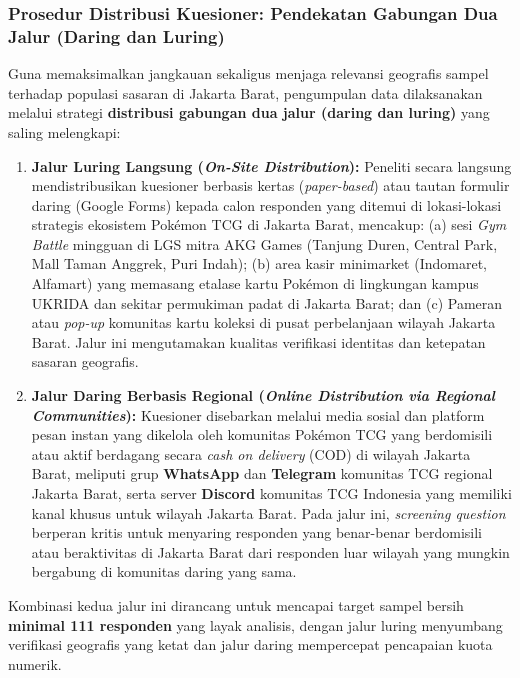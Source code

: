 \documentclass[12pt,a4paper]{article}
\numberwithin{equation}{section}
\numberwithin{table}{section}
\numberwithin{figure}{section}
\begin{document}
\subsubsection{Prosedur Distribusi Kuesioner: Pendekatan Gabungan Dua Jalur (Daring dan Luring)}

Guna memaksimalkan jangkauan sekaligus menjaga relevansi geografis sampel terhadap populasi sasaran di Jakarta Barat, pengumpulan data dilaksanakan melalui strategi \textbf{distribusi gabungan dua jalur (daring dan luring)} yang saling melengkapi:
\begin{enumerate}
  \item \textbf{Jalur Luring Langsung (\emph{On-Site Distribution}):} Peneliti secara langsung mendistribusikan kuesioner berbasis kertas (\emph{paper-based}) atau tautan formulir daring (Google Forms) kepada calon responden yang ditemui di lokasi-lokasi strategis ekosistem Pok\'emon TCG di Jakarta Barat, mencakup: (a) sesi \emph{Gym Battle} mingguan di LGS mitra AKG Games (Tanjung Duren, Central Park, Mall Taman Anggrek, Puri Indah); (b) area kasir minimarket (Indomaret, Alfamart) yang memasang etalase kartu Pok\'emon di lingkungan kampus UKRIDA dan sekitar permukiman padat di Jakarta Barat; dan (c) Pameran atau \emph{pop-up} komunitas kartu koleksi di pusat perbelanjaan wilayah Jakarta Barat. Jalur ini mengutamakan kualitas verifikasi identitas dan ketepatan sasaran geografis.
  \item \textbf{Jalur Daring Berbasis Regional (\emph{Online Distribution via Regional Communities}):} Kuesioner disebarkan melalui media sosial dan platform pesan instan yang dikelola oleh komunitas Pok\'emon TCG yang berdomisili atau aktif berdagang secara \emph{cash on delivery} (COD) di wilayah Jakarta Barat, meliputi grup \textbf{WhatsApp} dan \textbf{Telegram} komunitas TCG regional Jakarta Barat, serta server \textbf{Discord} komunitas TCG Indonesia yang memiliki kanal khusus untuk wilayah Jakarta Barat. Pada jalur ini, \emph{screening question} berperan kritis untuk menyaring responden yang benar-benar berdomisili atau beraktivitas di Jakarta Barat dari responden luar wilayah yang mungkin bergabung di komunitas daring yang sama.
\end{enumerate}

Kombinasi kedua jalur ini dirancang untuk mencapai target sampel bersih \textbf{minimal 111 responden} yang layak analisis, dengan jalur luring menyumbang verifikasi geografis yang ketat dan jalur daring mempercepat pencapaian kuota numerik.
\end{document}
